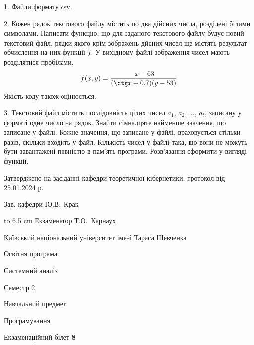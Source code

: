 \documentclass[12pt, ukrainian]{article}
\begin{document}
{%
1. Файли формату csv.%
\par
\vspace{2mm}

2. Кожен рядок текстового файлу містить по два дійсних числа, розділені білими символами.
Написати функцію, що для заданого текстового файлу будує новий текстовий файл, рядки якого крім зображень дйсних чисел ще містять результат обчислення на них функції $f$. У вихідному файлі зображення чисел мають розділятися пробілами. 
$$f(x, y) =\frac{\ x - 63}{(\ctg x + 0.7) (y - 53)}$$ 
Якість коду також оцінюється.

\par
\vspace{2mm}

3. Текстовий файл містить послідовність цілих чисел $a_1$, $a_2$, $\ldots$, $a_t$, записану у форматі одне число на рядок. Знайти сімнадцяте найменше значення, що записане у файлі. Кожне значення, що записане у файлі, враховується стільки разів, скільки входить у файл. Кількість чисел у файлі така, що вони не можуть бути завантажені повністю в пам'ять програми. Розв'язання оформити у вигляді функції.

}
{\smallskip\smallskip \begin {scriptsize} Затверджено на засіданні кафедри теоретичної кібернетики, протокол   від   25.01.2024 р.\par\smallskip\smallskip\smallskip\smallskip
{\parbox {6.5 cm} {Зав. кафедри \dotfill Ю.В.~Крак}}\hspace {0.7cm} {\hbox to 6.5 cm { Екзаменатор \dotfill Т.О.~Карнаух}} \end{scriptsize}}
\vspace{0.9cm}
{{\begin {scriptsize}\par
{ \center  Київський національний університет імені Тараса Шевченка \par}
{\parbox {5 cm}{Освітня програма \hfill}{\parbox {7 cm}{Системний аналіз\hfill}}\parbox {6 cm}{\hfill Семестр 2}}\par
{\parbox {5 cm} {Навчальний предмет \hfill}\parbox {7 cm}{Програмування \hfill}\parbox {6cm}{\hfill}\par}\vspace{-15pt} \end{scriptsize}}{\center Екзаменаційний білет \No \textbf { 8 }\par}}
\end{document}
